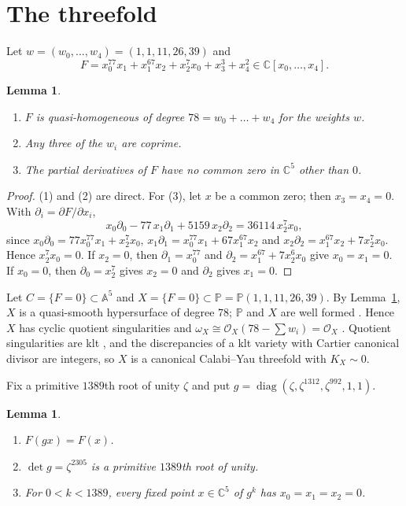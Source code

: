 \documentclass{amsart}
\newtheorem{lemma}[theorem]{Lemma}
\theoremstyle{remark}
\newcommand{\C}{\mathbb{C}}
\newcommand{\PP}{\mathbb{P}}
\newcommand{\A}{\mathbb{A}}
\begin{document}
\section{The threefold}\label{sec:x}

Let $w=(w_0,\dots,w_4)=(1,1,11,26,39)$ and
\[
F=x_0^{77}x_1+x_1^{67}x_2+x_2^{7}x_0+x_3^3+x_4^2\in\C[x_0,\dots,x_4].
\]

\begin{lemma}\label{lem:F}
\begin{enumerate}
\item $F$ is quasi-homogeneous of degree $78=w_0+\dots+w_4$ for the weights $w$.
\item Any three of the $w_i$ are coprime.
\item The partial derivatives of $F$ have no common zero in $\C^5$ other than $0$.
\end{enumerate}
\end{lemma}

\begin{proof}
(1) and (2) are direct. For (3), let $x$ be a common zero; then $x_3=x_4=0$. With $\partial_i=\partial F/\partial x_i$,
\[
x_0\partial_0-77\,x_1\partial_1+5159\,x_2\partial_2=36114\,x_2^7x_0,
\]
since $x_0\partial_0=77x_0^{77}x_1+x_2^7x_0$, $x_1\partial_1=x_0^{77}x_1+67x_1^{67}x_2$ and $x_2\partial_2=x_1^{67}x_2+7x_2^7x_0$. Hence $x_2^7x_0=0$. If $x_2=0$, then $\partial_1=x_0^{77}$ and $\partial_2=x_1^{67}+7x_2^6x_0$ give $x_0=x_1=0$. If $x_0=0$, then $\partial_0=x_2^7$ gives $x_2=0$ and $\partial_2$ gives $x_1=0$.
\end{proof}

Let $C=\{F=0\}\subset\A^5$ and $X=\{F=0\}\subset\PP=\PP(1,1,11,26,39)$. By Lemma~\ref{lem:F}, $X$ is a quasi-smooth hypersurface of degree $78$; $\PP$ and $X$ are well formed \cite[6.10]{IF}. Hence $X$ has cyclic quotient singularities and $\omega_X\cong\mathcal O_X(78-\sum w_i)=\mathcal O_X$ \cite[6.14]{IF}. Quotient singularities are klt \cite[5.20]{KM}, and the discrepancies of a klt variety with Cartier canonical divisor are integers, so $X$ is a canonical Calabi--Yau threefold with $K_X\sim0$.

Fix a primitive $1389$th root of unity $\zeta$ and put $g=\operatorname{diag}(\zeta,\zeta^{1312},\zeta^{992},1,1)$.

\begin{lemma}\label{lem:g}
\begin{enumerate}
\item $F(gx)=F(x)$.
\item $\det g=\zeta^{2305}$ is a primitive $1389$th root of unity.
\item For $0<k<1389$, every fixed point $x\in\C^5$ of $g^k$ has $x_0=x_1=x_2=0$.
\end{enumerate}
\end{lemma}
\end{document}
